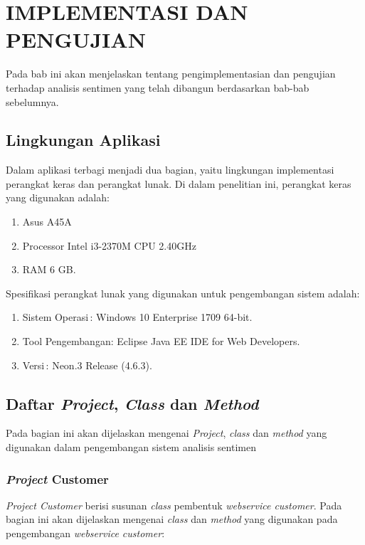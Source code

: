 \chapter{IMPLEMENTASI DAN PENGUJIAN}

%

\vspace{4.5pt}
Pada bab ini akan menjelaskan tentang pengimplementasian dan pengujian terhadap analisis sentimen yang telah dibangun berdasarkan bab-bab sebelumnya.
\section{Lingkungan Aplikasi}
Dalam aplikasi terbagi menjadi dua bagian, yaitu lingkungan implementasi perangkat keras dan perangkat lunak. Di dalam penelitian ini, perangkat keras yang digunakan adalah:
\begin{enumerate}[leftmargin=*]
	\item Asus A45A
	\item Processor Intel i3-2370M CPU 2.40GHz
	\item RAM 6 GB.
\end{enumerate}

Spesifikasi perangkat lunak yang digunakan untuk pengembangan sistem adalah:
\begin{enumerate}[leftmargin=*]
	\item Sistem Operasi\quad\quad\quad\,: Windows 10 Enterprise 1709 64-bit.
	\item Tool Pengembangan\quad: Eclipse Java EE IDE for Web Developers.
	\item Versi\quad\quad\quad\quad\quad\quad\,: Neon.3 Release (4.6.3).
\end{enumerate}

\section{Daftar \textit{Project}, \textit{Class} dan \textit{Method}}
Pada bagian ini akan dijelaskan mengenai \textit{Project}, \textit{class} dan \textit{method} yang digunakan dalam pengembangan sistem analisis sentimen
\subsection{\textit{Project} Customer}
\textit{Project Customer} berisi susunan \textit{class} pembentuk \textit{webservice customer}. Pada bagian ini akan dijelaskan mengenai \textit{class} dan \textit{method} yang digunakan pada pengembangan \textit{ webservice customer}:
